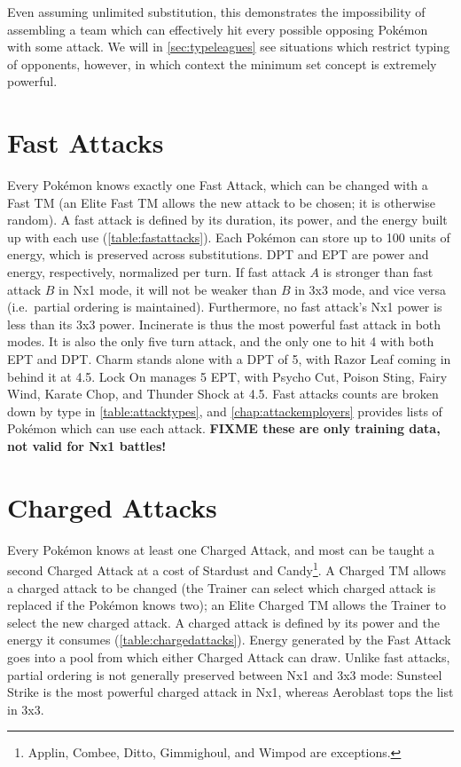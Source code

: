 Even assuming unlimited substitution, this demonstrates the
  impossibility of assembling a team which can effectively
  hit every possible opposing Pokémon with some attack.
We will in \autoref{sec:typeleagues} see situations which restrict typing
  of opponents, however, in which context the minimum set concept
  is extremely powerful.

\section{Fast Attacks}
Every Pokémon knows exactly one Fast Attack, which can be changed with a Fast TM
 (an Elite Fast TM allows the new attack to be chosen; it is otherwise random).
A fast attack is defined by its duration, its power, and the energy built up with each use (\autoref{table:fastattacks}).
Each Pokémon can store up to 100 units of energy, which is preserved across substitutions.
DPT and EPT are power and energy, respectively, normalized per turn.
If fast attack $A$ is stronger than fast attack $B$ in Nx1 mode, it will not be
  weaker than $B$ in 3x3 mode, and vice versa (i.e.\ partial ordering is maintained).
Furthermore, no fast attack's Nx1 power is less than its 3x3 power.
Incinerate is thus the most powerful fast attack in both modes.
It is also the only five turn attack, and the only one to hit 4 with both EPT and DPT\@.
Charm stands alone with a DPT of 5, with Razor Leaf coming in behind it at 4.5.
Lock On manages 5 EPT, with Psycho Cut, Poison Sting, Fairy Wind, Karate Chop,
  and Thunder Shock at 4.5.
Fast attacks counts are broken down by type in \autoref{table:attacktypes},
 and \autoref{chap:attackemployers} provides lists of Pokémon which can use each attack.
  \textbf{FIXME these are only training data, not valid for Nx1 battles!}



\section{Charged Attacks}
Every Pokémon knows at least one Charged Attack, and most can be taught a second
  Charged Attack at a cost of Stardust and Candy\footnote{Applin, Combee, Ditto, Gimmighoul, and Wimpod are exceptions.}.
A Charged TM allows a charged attack to be changed (the Trainer can select
  which charged attack is replaced if the Pokémon knows two);
  an Elite Charged TM allows the Trainer to select the new charged attack.
A charged attack is defined by its power and the energy it consumes (\autoref{table:chargedattacks}).
Energy generated by the Fast Attack goes into a pool from which either Charged Attack can draw.
Unlike fast attacks, partial ordering is not generally preserved between Nx1 and 3x3 mode:
  Sunsteel Strike is the most powerful charged attack in Nx1, whereas Aeroblast tops
  the list in 3x3.


